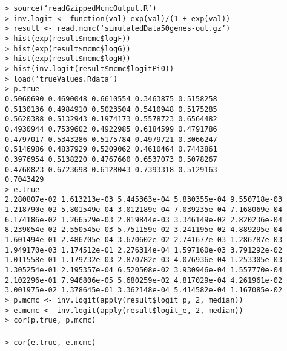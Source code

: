 \documentclass[12pt,]{article}
\begin{document}
{\tt  > source(`readGzippedMcmcOutput.R') \\
> inv.logit <- function(val) exp(val)/(1 + exp(val)) \\
> result <- read.mcmc(`simulatedData50genes-out.gz') \\
> hist(exp(result\$mcmc\$logF)) \\
> hist(exp(result\$mcmc\$logG)) \\
> hist(exp(result\$mcmc\$logH)) \\
> hist(inv.logit(result\$mcmc\$logitPi0)) \\
> load(`trueValues.Rdata') \\
> p.true \\
 0.5060690 0.4690048 0.6610554 0.3463875 0.5158258 \\
 0.5130136 0.4984910 0.5023504 0.5410948 0.5175285 \\
 0.5620388 0.5132943 0.1974173 0.5578723 0.6564482 \\ 
 0.4930944 0.7539602 0.4922985 0.6184599 0.4791786 \\
 0.4797017 0.5343286 0.5175784 0.4979721 0.3066247 \\
 0.5146986 0.4837929 0.5209062 0.4610464 0.7443861 \\
 0.3976954 0.5138220 0.4767660 0.6537073 0.5078267 \\
 0.4760823 0.6723698 0.6128043 0.7393318 0.5129163 \\
 0.7043429 \\
> e.true \\
\quad [1] 2.280807e-02 1.613213e-03 5.445363e-04 5.830355e-04 9.550718e-03 \\
\quad [6] 1.218790e-02 5.801549e-04 3.012189e-04 7.039235e-04 7.168069e-04 \\
\quad [11] 6.174186e-02 1.266529e-03 2.819844e-03 3.346149e-02 2.820236e-04 \\
\quad [16] 8.239054e-02 2.550545e-03 5.751159e-02 3.241195e-02 4.889295e-04 \\ 
\quad [21] 1.601494e-01 2.486705e-04 3.670602e-02 2.741677e-03 1.286787e-03 \\ 
\quad [26] 1.949170e-03 1.174512e-01 2.276314e-04 1.597160e-03 3.791292e-02 \\
\quad [31] 1.011558e-01 1.179732e-03 2.870782e-03 4.076936e-04 1.253305e-03 \\
\quad [36] 1.305254e-01 2.195357e-04 6.520508e-02 3.930946e-04 1.557770e-04 \\
\quad [41] 2.102296e-01 7.946806e-05 5.680259e-02 4.817029e-04 4.261961e-02 \\
\quad [46] 3.001975e-02 1.378645e-01 3.362148e-04 5.414582e-04 1.167085e-02 \\
> p.mcmc <- inv.logit(apply(result\$logit\_p, 2, median)) \\
> e.mcmc <- inv.logit(apply(result\$logit\_e, 2, median)) \\
> cor(p.true, p.mcmc) \\
 \\
> cor(e.true, e.mcmc) \\
 \\
}
\end{document}

